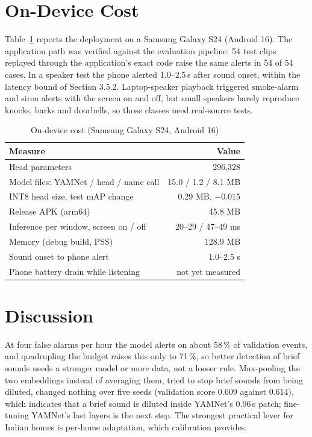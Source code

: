 \documentclass[12pt,a4paper,oneside]{report}
\begin{document}
\section{On-Device Cost}
Table~\ref{tab:device} reports the deployment on a Samsung Galaxy S24 (Android 16). The application path was verified against the evaluation pipeline: 54 test clips replayed through the application's exact code raise the same alerts in 54 of 54 cases. In a speaker test the phone alerted 1.0--2.5\,s after sound onset, within the latency bound of Section 3.5.2. Laptop-speaker playback triggered smoke-alarm and siren alerts with the screen on and off, but small speakers barely reproduce knocks, barks and doorbells, so those classes need real-source tests.

\begin{table}[h]
\caption{On-device cost (Samsung Galaxy S24, Android 16)}
\label{tab:device}
\centering\small
\begin{tabular}{@{}lr@{}}
\toprule
Measure & Value\\
\midrule
Head parameters & 296,328\\
Model files: YAMNet / head / name call & 15.0 / 1.2 / 8.1 MB\\
INT8 head size, test mAP change & 0.29 MB, $-0.015$\\
Release APK (arm64) & 45.8 MB\\
Inference per window, screen on / off & 20--29 / 47--49 ms\\
Memory (debug build, PSS) & 128.9 MB\\
Sound onset to phone alert & 1.0--2.5 s\\
Phone battery drain while listening & not yet measured\\
\bottomrule
\end{tabular}
\end{table}

\section{Discussion}
At four false alarms per hour the model alerts on about 58\,\% of validation events, and quadrupling the budget raises this only to 71\,\%, so better detection of brief sounds needs a stronger model or more data, not a looser rule. Max-pooling the two embeddings instead of averaging them, tried to stop brief sounds from being diluted, changed nothing over five seeds (validation score 0.609 against 0.614), which indicates that a brief sound is diluted inside YAMNet's 0.96\,s patch; fine-tuning YAMNet's last layers is the next step. The strongest practical lever for Indian homes is per-home adaptation, which calibration provides.
\end{document}
